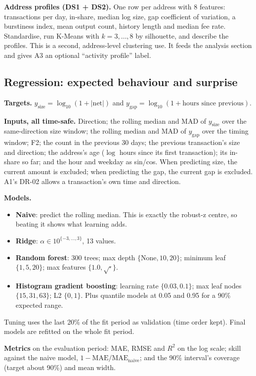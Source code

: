 \textbf{Address profiles (DS1 + DS2).} One row per address with 8 features: transactions per day,
in-share, median log size, gap coefficient of variation, a burstiness index, mean output count,
history length and median fee rate. Standardise, run K-Means with $k = 3,\dots,8$ by silhouette,
and describe the profiles. This is a second, address-level clustering use. It feeds the analysis
section and gives A3 an optional ``activity profile'' label.

\subsection{Regression: expected behaviour and surprise}
\label{sec:regression}

\textbf{Targets.} $y_{\text{size}} = \log_{10}(1+|\text{net}|)$ and $y_{\text{gap}} =
\log_{10}(1+\text{hours since previous})$.

\textbf{Inputs, all time-safe.} Direction; the rolling median and MAD of $y_{\text{size}}$ over
the same-direction size window; the rolling median and MAD of $y_{\text{gap}}$ over the timing
window; F2; the count in the previous 30 days; the previous transaction's size and direction; the
address's age ($\log$ hours since its first transaction); its in-share so far; and the hour and
weekday as sin/cos. When predicting size, the current amount is excluded; when predicting the gap,
the current gap is excluded. A1's DR-02 allows a transaction's own time and direction.

\textbf{Models.}
\begin{itemize}
  \item \textbf{Naive}: predict the rolling median. This is exactly the robust-z centre, so beating
    it shows what learning adds.
  \item \textbf{Ridge}: $\alpha \in 10^{\{-3,\dots,3\}}$, 13 values.
  \item \textbf{Random forest}: 300 trees; max depth $\{\text{None},10,20\}$; minimum leaf
    $\{1,5,20\}$; max features $\{1.0, \sqrt{\cdot}\}$.
  \item \textbf{Histogram gradient boosting}: learning rate $\{0.03, 0.1\}$; max leaf nodes $\{15,
    31, 63\}$; L2 $\{0, 1\}$. Plus quantile models at 0.05 and 0.95 for a 90\% expected range.
\end{itemize}
Tuning uses the last 20\% of the fit period as validation (time order kept). Final models are
refitted on the whole fit period.

\textbf{Metrics} on the evaluation period: MAE, RMSE and $R^2$ on the log scale; skill against the
naive model, $1 - \text{MAE}/\text{MAE}_{\text{naive}}$; and the 90\% interval's coverage (target
about 90\%) and mean width.

